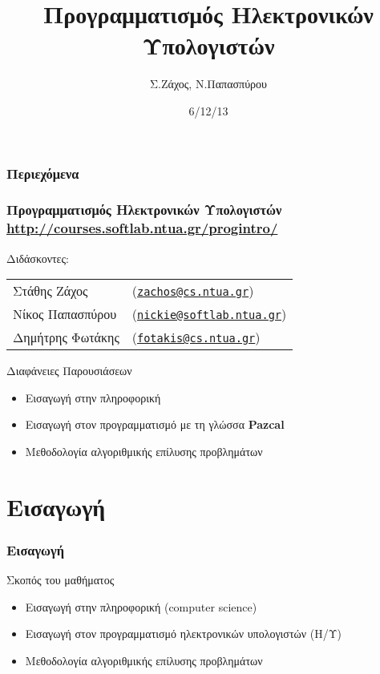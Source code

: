 \documentclass{beamer}
\title[Προγραμματισμός Ηλεκτρονικών Υπολογιστών]{Προγραμματισμός Ηλεκτρονικών Υπολογιστών}
\author[Σ.Ζάχος, Ν.Παπασπύρου]{Σ.Ζάχος, Ν.Παπασπύρου}
\date[12/13]{6/12/13}
\begin{document}
\begin{frame}
\titlepage
\end{frame}

\begin{frame}
  \frametitle{Περιεχόμενα}
    \tableofcontents%
\end{frame}

\begin{frame}
	\frametitle{Προγραμματισμός Ηλεκτρονικών Υπολογιστών\\
		\url{http://courses.softlab.ntua.gr/progintro/}}

	Διδάσκοντες:
	\begin{tabular}{ll}
	  Στάθης Ζάχος & (\href{mailto:zachos@cs.ntua.gr}{\nolinkurl{zachos@cs.ntua.gr}}) \\
	  Νίκος Παπασπύρου & (\href{mailto:nickie@softlab.ntua.gr}{\nolinkurl{nickie@softlab.ntua.gr}}) \\
	  Δημήτρης Φωτάκης & (\href{mailto:fotakis@cs.ntua.gr}{\nolinkurl{fotakis@cs.ntua.gr}})
	\end{tabular}
	\vskip20pt

	\begin{center}{\large Διαφάνειες Παρουσιάσεων}\end{center}
	\begin{itemize}
	  \item Εισαγωγή στην πληροφορική
		\item Εισαγωγή στον προγραμματισμό με τη γλώσσα
			\textbf{{\color{officegreen}Pa{\color{red}z}cal}}
	  \item Μεθοδολογία αλγοριθμικής επίλυσης προβλημάτων
	\end{itemize}

\end{frame}

\section{Εισαγωγή}
\begin{frame}
	\frametitle{Εισαγωγή}
	{\large Σκοπός του μαθήματος}
	\begin{itemize}
		\item Εισαγωγή στην {\color{violet}πληροφορική} (computer science)
		\item Εισαγωγή στον {\color{violet}προγραμματισμό} ηλεκτρονικών
			υπολογιστών (Η/Υ)
		\item Μεθοδολογία {\color{violet}αλγοριθμικής επίλυσης προβλημάτων}
	\end{itemize}
\end{frame}
\end{document}
